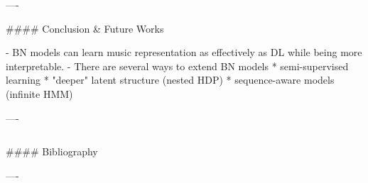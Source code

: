 \documentclass{beamer}
\begin{document}
\begin{frame}[fragile]
\begin{columns}[T]
\begin{column}{.46\textwidth}
\begin{markdown}
----

#### Conclusion \& Future Works

- BN models can learn music representation as effectively as DL while being more interpretable.
- There are several ways to extend BN models
    * semi-supervised learning
    * "deeper" latent structure (nested HDP)
    * sequence-aware models (infinite HMM)

----


\end{markdown}
\end{column}
\end{columns}

\begin{markdown}

#### Bibliography




----

\end{markdown}

\end{frame}
\end{document}
